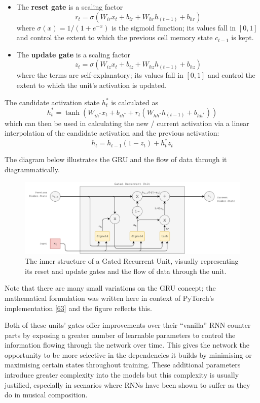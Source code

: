 \documentclass[12pt,]{article}
\providecommand{\tightlist}{%
  \setlength{\itemsep}{0pt}\setlength{\parskip}{0pt}}
\begin{document}
\begin{itemize}
\tightlist
\item
  The \textbf{reset gate} is a scaling factor
  \[r_t = \sigma(W_{ir} x_t + b_{ir} + W_{hr} h_{(t-1)} + b_{hr})\]
  where \(\sigma(x) = 1 / (1 + e^{-x})\) is the sigmoid function; its
  values fall in \([0,1]\) and control the extent to which the previous
  cell memory state \(c_{t-1}\) is kept.
\item
  The \textbf{update gate} is a scaling factor
  \[z_t = \sigma(W_{iz} x_t + b_{iz} + W_{hz} h_{(t-1)} + b_{hz})\]
  where the terms are self-explanatory; its values fall in \([0,1]\) and
  control the extent to which the unit's activation is updated.
\end{itemize}

The candidate activation state \(h_t^*\) is calculated as
\[h_t^* = \tanh(W_{ih^*} x_t + b_{ih^*} + r_t (W_{hh^*} h_{(t-1)} + b_{hh^*}))\]
which can then be used in calculating the new / current activation via a
linear interpolation of the candidate activation and the previous
activation: \[h_t = h_{t-1} (1 - z_t) + h_t^* z_t\]

The diagram below illustrates the GRU and the flow of data through it
diagrammatically.

\begin{figure}
\centering
\includegraphics{Images/gru.png}
\caption{The inner structure of a Gated Recurrent Unit, visually
representing its reset and update gates and the flow of data through the
unit.}
\end{figure}

Note that there are many small variations on the GRU concept; the
mathematical formulation was written here in context of PyTorch's
implementation {[}\protect\hyperlink{ref-pytorchgru}{63}{]} and the
figure reflects this.

Both of these units' gates offer improvements over their ``vanilla'' RNN
counter parts by exposing a greater number of learnable parameters to
control the information flowing through the network over time. This
gives the network the opportunity to be more selective in the
dependencies it builds by minimising or maximising certain states
throughout training. These additional parameters introduce greater
complexity into the models but this complexity is usually justified,
especially in scenarios where RNNs have been shown to suffer as they do
in musical composition.
\end{document}
